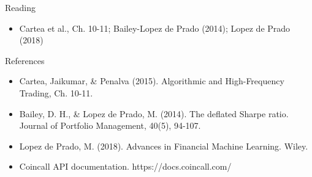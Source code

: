 \documentclass[aspectratio=169,10pt]{beamer}
\begin{document}
\begin{frame}{Reading}
\begin{itemize}
  \item Cartea et al., Ch. 10-11; Bailey-Lopez de Prado (2014); Lopez de Prado (2018)
\end{itemize}
\end{frame}

\begin{frame}{References}
\scriptsize\begin{itemize}\setlength{\itemsep}{3pt}
  \item Cartea, Jaikumar, \& Penalva (2015). Algorithmic and High-Frequency Trading, Ch. 10-11.
  \item Bailey, D. H., \& Lopez de Prado, M. (2014). The deflated Sharpe ratio. Journal of Portfolio Management, 40(5), 94-107.
  \item Lopez de Prado, M. (2018). Advances in Financial Machine Learning. Wiley.
  \item Coincall API documentation. https://docs.coincall.com/
\end{itemize}
\end{frame}
\end{document}
